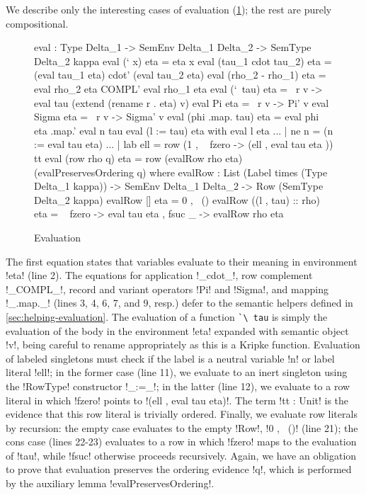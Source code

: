 \documentclass[sigplan,10pt,anonymous,review]{acmart}\settopmatter{printfolios=true,printccs=false,printacmref=false}
\begin{document}
We describe only the interesting cases of evaluation (\cref{fig:evaluation}); the rest are purely compositional. 

\begin{figure}
\begin{agda}
eval : Type Delta_1 -> SemEnv Delta_1  Delta_2 -> SemType Delta_2  kappa
eval (` x) eta = eta x
eval (tau_1  cdot  tau_2) eta = (eval tau_1  eta) cdot' (eval tau_2  eta)
eval (rho_2 - rho_1) eta = eval rho_2 eta COMPL' eval rho_1  eta 
eval (`\ tau) eta = \ r v -> 
  eval tau (extend (rename r . eta) v)
eval Pi eta = \ r v -> Pi' v
eval Sigma eta = \ r v -> Sigma' v
eval (phi .map. tau) eta = eval phi eta .map.' eval n tau
eval (l := tau) eta with eval l eta 
... | ne n = (n := eval tau eta)
... | lab ell = row (1 , \ { fzero -> 
                            (ell , eval tau eta )}) tt
eval (row rho q) eta = row 
  (evalRow rho eta) 
  (evalPreservesOrdering q)
where
  evalRow : List (Label times (Type Delta_1 kappa)) -> 
            SemEnv Delta_1  Delta_2 -> 
            Row (SemType Delta_2 kappa)
  evalRow [] eta = 0 , \ ()
  evalRow ((l , tau) :: rho) eta = \ { fzero -> eval tau eta , 
                          fsuc _ -> evalRow rho eta }
\end{agda}
\caption{Evaluation}
\label{fig:evaluation}
\end{figure}

The first equation states that variables evaluate to their meaning in environment !eta! (line 2). The equations for application !_cdot_!, row complement !_COMPL_!, record and variant operators !Pi! and !Sigma!, and mapping !_.map._! (lines 3, 4, 6, 7, and 9, resp.) defer to the semantic helpers defined in \cref{sec:helping-evaluation}. The evaluation of a function \lstinline{`\ tau} is simply the evaluation of the body in the environment !eta! expanded with semantic object !v!, being careful to rename appropriately as this is a Kripke function. Evaluation of labeled singletons must check if the label is a neutral variable !n! or label literal !ell!; in the former case (line 11), we evaluate to an inert singleton using the !RowType! constructor !_:=_!; in the latter (line 12), we evaluate to a row literal in which !fzero! points to !(ell , eval tau eta)!. The term !tt : Unit! is the evidence that this row literal is trivially ordered. Finally, we evaluate row literals by recursion: the empty case evaluates to the empty !Row!, !0 , \ ()! (line 21); the cons case (lines 22-23) evaluates to a row in which !fzero! maps to the evaluation of !tau!, while !fsuc! otherwise proceeds recursively. Again, we have an obligation to prove that evaluation preserves the ordering evidence !q!, which is performed by the auxiliary lemma !evalPreservesOrdering!.
\end{document}
